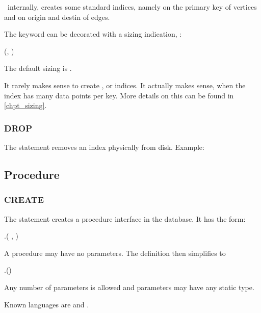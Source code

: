 
\nowdb\, internally, creates some standard indices,
namely on the primary key of vertices and on origin
and destin of edges.

The  keyword can be decorated with a sizing
indication, \eg:

   
(, )

The default sizing is .

It rarely makes sense to create 
, 
 or 
 indices.
It actually makes sense,
when the index
has many data points per key.
More details on this can be found in \ref{chpt_sizing}.

\subsubsection{DROP}
The  statement removes an index physically from disk.
Example:

 

\subsection{Procedure}
\subsubsection{CREATE}
The  statement
creates a procedure interface in the database.
It has the form:

 .(
                            ,
                            )
                            

A procedure may have no parameters.
The definition then simplifies to

 .()
                            

Any number of parameters is allowed and parameters may have
any static type.

Known languages are  and .

